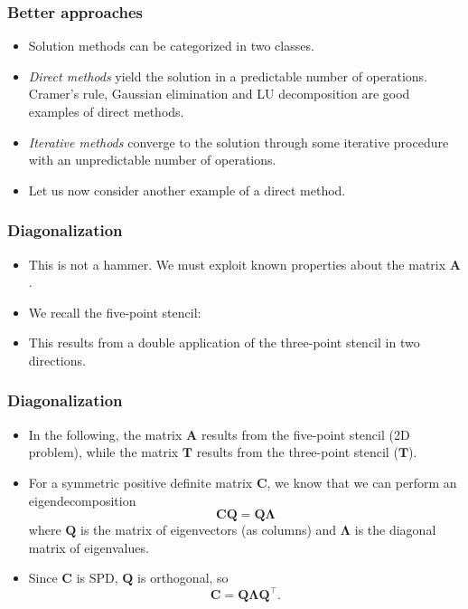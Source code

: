 \begin{frame}
  \frametitle{Better approaches}
  \begin{itemize}
  \item Solution methods can be categorized in two classes.
  \item \emph{Direct methods} yield the solution in a predictable number of
    operations. Cramer's rule, Gaussian elimination and LU decomposition are
    good examples of direct methods.
  \item \emph{Iterative methods} converge to the solution through some iterative
    procedure with an unpredictable number of operations.
  \item Let us now consider another example of a direct method.
  \end{itemize}
\end{frame}

\begin{frame}
  \frametitle{Diagonalization}
  \begin{itemize}
  \item This is not a hammer. We must exploit known properties about the matrix
    $\bm A$.
  \item We recall the five-point stencil:
    \begin{center}
      \scalebox{0.5}{}
    \end{center}
  \item This results from a double application of the three-point stencil in two
    directions.
    \begin{center}
      \scalebox{0.5}{}
    \end{center}
  \end{itemize}
\end{frame}

\begin{frame}
  \frametitle{Diagonalization}
  \begin{itemize}
  \item In the following, the matrix $\bm A$ results from the five-point
    stencil (2D problem), while the matrix $\bm T$ results from the three-point
    stencil ($\bm T$).
  \item For a symmetric positive definite matrix $\bm C$, we know that we can
    perform an eigendecomposition
    \[ \bm C \bm Q = \bm Q \bm \Lambda \]
    where $\bm Q$ is the matrix of eigenvectors (as columns) and $\bm \Lambda$
    is the diagonal matrix of eigenvalues.
  \item Since $\bm C$ is SPD, $\bm Q$ is orthogonal, so
    \[ \bm C = \bm Q \bm \Lambda \bm Q^\intercal. \]
  \end{itemize}
\end{frame}

